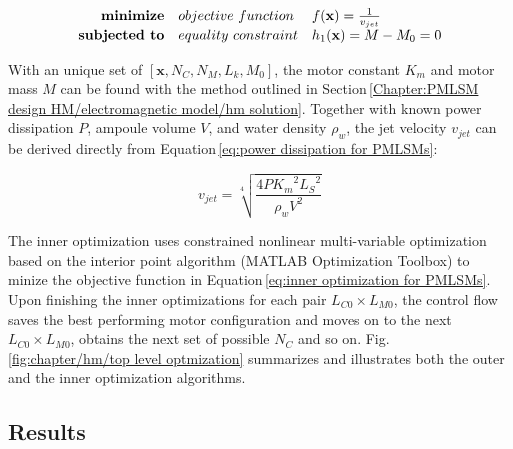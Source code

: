             
            \begin{equation}
                \begin{array}{rll}
                    \textbf{minimize}       & \small{objective\,\,function}     & f(\textbf{x})=\frac{1}{v_{jet}} \\
                    \textbf{subjected to}   & \small{equality\,\,constraint}    & h_1(\textbf{x})=M - M_0= 0
                \end{array}
                \label{eq:inner optimization for PMLSMs}
            \end{equation}
            
            
            
            With an unique set of $\left[\textbf{x}, N_C,N_M,L_k,M_0\right]$, the motor constant $K_m$ and motor mass $M$ can be found with the method outlined in Section\,\ref{Chapter:PMLSM design HM/electromagnetic model/hm solution}. Together with known power dissipation $P$, ampoule volume $V$, and water density $\rho_w$, the jet velocity $v_{jet}$ can be derived directly from Equation\,\ref{eq:power dissipation for PMLSMs}:
            
            
            \begin{equation}
                v_{jet} = \sqrt[4]{\frac{4P {K_m}^2 {L_S}^2}{\rho_w V^2}}
                \label{eq:v_jet}
            \end{equation}
            
            
            The inner optimization uses constrained nonlinear multi-variable optimization based on the interior point algorithm (MATLAB Optimization Toolbox) to minize the objective function in Equation\,\ref{eq:inner optimization for PMLSMs}. Upon finishing the inner optimizations for each pair $L_{C0} \times L_{M0}$, the control flow saves the best performing motor configuration and moves on to the next $L_{C0} \times L_{M0}$, obtains the next set of possible $N_C$ and so on. Fig.\,\ref{fig:chapter/hm/top level optmization} summarizes and illustrates both the outer and the inner optimization algorithms.
    
    
    \subsection{Results}                        \label{Chapter:PMLSM design HM/design optimization/results}
    
